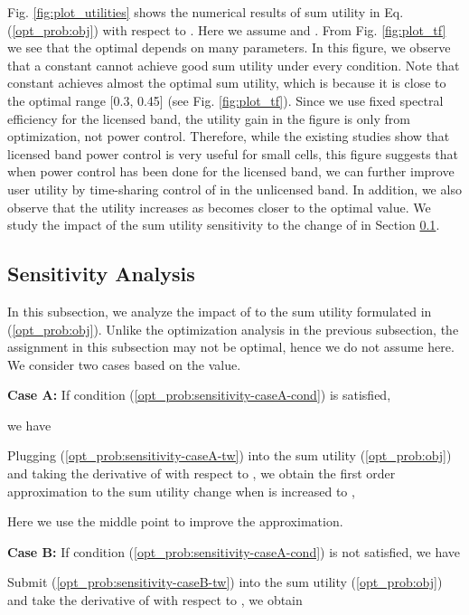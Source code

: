 \documentclass[journal,final,letterpaper,10pt,doublecolumn,twoside]{IEEEtran}
\begin{document}
Fig. \ref{fig:plot_utilities} shows the numerical results of sum utility in Eq. (\ref{opt_prob:obj}) with respect to . Here we assume  and .
From Fig. \ref{fig:plot_tf} we see that the optimal  depends on many parameters. In this figure, we observe that a constant  cannot achieve good sum utility under every condition.
Note that constant  achieves almost the optimal sum utility, which is because it is close to the optimal  range [0.3, 0.45] (see Fig. \ref{fig:plot_tf}). Since we use fixed spectral efficiency for the licensed band, the utility gain in the figure is only from  optimization, not power control.
Therefore, while the existing studies \cite{femto-PowerControl-2010Sundeep}  show that licensed band power control is very useful for small cells, this figure suggests that when power control has been done for the licensed band, we can further improve user utility by time-sharing control of  in the unlicensed band.
In addition, we also observe that the utility increases as  becomes closer to the optimal value. We study the impact of the sum utility sensitivity to the change of  in Section \ref{subsec:Sensitivity-Analysis}.


\subsection{Sensitivity Analysis} \label{subsec:Sensitivity-Analysis}
In this subsection, we analyze the impact of   to the sum utility   formulated in (\ref{opt_prob:obj}). Unlike the optimization analysis in the previous subsection, the  assignment in this subsection may not be optimal, hence we do not assume  here. We consider two cases based on the  value.


\textbf{Case A:} If condition (\ref{opt_prob:sensitivity-caseA-cond}) is satisfied,

we have

Plugging (\ref{opt_prob:sensitivity-caseA-tw}) into the sum utility (\ref{opt_prob:obj})  and taking the derivative of  with respect to , we obtain the first order approximation to the sum utility change  when  is increased to ,



Here we use the middle point  to improve the approximation.


\textbf{Case B:} If condition (\ref{opt_prob:sensitivity-caseA-cond}) is not satisfied, we have

Submit (\ref{opt_prob:sensitivity-caseB-tw}) into the sum utility (\ref{opt_prob:obj})  and take the derivative of  with respect to , we obtain
\end{document}

